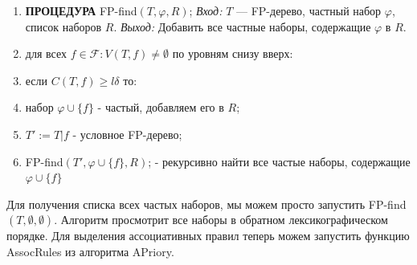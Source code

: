 \noindent\hrulefill %
\begin{enumerate}
    \item \textbf{ПРОЦЕДУРА} FP-find$(T,\varphi,R)$;
    \newline
    \quad \textit{Вход:} $T$ — FP-дерево, частный набор $\varphi$, список наборов $R$.
    \newline
    \quad \textit{Выход:} Добавить все частные наборы, содержащие $\varphi$ в $R$.
    \item \quad для всех $f \in \mathcal{F} : V(T,f) \neq \emptyset$ по уровням снизу вверх:
    \item \quad \quad если $C(T,f) \geq l\delta$ то:
    \item \quad \quad \quad набор $\varphi \cup \{f\}$ - частый, добавляем его в $R$;
    \item \quad \quad \quad $T':=T|f$ - условное FP-дерево;
    \item \quad \quad \quad FP-find$(T',\varphi \cup \{f\},R)$; - рекурсивно найти все частые наборы, содержащие $\varphi \cup \{f\}$
\end{enumerate}
\noindent\hrulefill %
\newline\newline
Для получения списка всех частых наборов, мы можем просто запустить FP-find$(T,\emptyset,\emptyset)$. Алгоритм просмотрит все наборы в обратном лексикографическом порядке. Для выделения ассоциативных правил теперь можем запустить функцию AssocRules из алгоритма APriory.

